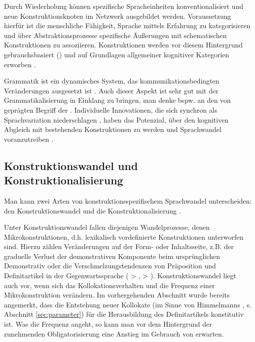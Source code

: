 Durch Wiederholung können spezifische Spracheinheiten konventionalisiert und neue Konstruktionsknoten im Netzwerk ausgebildet werden. Voraussetzung hierfür ist die menschliche Fähigkeit, Sprache mittels Erfahrung zu kategorisieren und über Abstraktionsprozesse spezifische Äußerungen mit schematischen Konstruktionen zu assoziieren. Konstruktionen werden vor diesem Hintergrund gebrauchsbasiert () und auf Grundlagen allgemeiner kognitiver Kategorien erworben \parencite[u.a.][]{Langacker1987,Goldberg2006,Bybee2006,Bybee2010,Bybee2013}.

Grammatik ist ein dynamisches System, das kommunikationsbedingten Veränderungen ausgesetzt ist \parencite[35f.]{Imo2007}. Auch dieser Aspekt ist sehr gut mit der Grammatikalisierung in Einklang zu bringen, man denke bspw. an den von  \textcite{Hopper1991} geprägten Begriff der . Individuelle Innovationen, die sich synchron als Sprachvariation niederschlagen \parencite{Croft2010}, haben das Potenzial, über den kognitiven Abgleich mit bestehenden Konstruktionen  zu werden und Sprachwandel voranzutreiben \parencite{Langacker1987}. 

\subsection{Konstruktionswandel und Konstruktionalisierung}\label{sec:konstruktionalisierung}

Man kann zwei Arten von konstruktionsspezifischem Sprachwandel unterscheiden: den Konstruktionswandel und die Konstruktionalisierung \parencite[vgl.][]{Hilpert2011,Hilpert2013,Fried2013,Traugott2013,Traugott2015,Trousdale2014}. 

Unter Konstruktionswandel fallen diejenigen Wandelprozesse, denen Mikrokonstruktionen, d.h. lexikalisch vordefinierte Konstruktionen unterworfen sind. Hierzu zählen Veränderungen auf der Form- oder Inhaltsseite, z.B. der graduelle Verlust der demonstrativen Komponente beim ursprünglichen Demonstrativ  oder die Verschmelzungstendenzen von Präposition und Definitartikel in der Gegenwartssprache ( > ,  > ). Konstruktionswandel liegt auch vor, wenn sich das Kollokationsverhalten und die Frequenz einer Mikrokonstruktion verändern. Im vorhergehenden Abschnitt wurde bereits angemerkt, dass die Entstehung neuer Kollokate (im Sinne von Himmelmanns  , s. Abschnitt \ref{sec:parameter}) für die Herausbildung des Definitartikels konstitutiv ist. Was die Frequenz angeht, so kann man vor dem Hintergrund der zunehmenden Obligatorisierung eine Anstieg im Gebrauch von  erwarten. 

